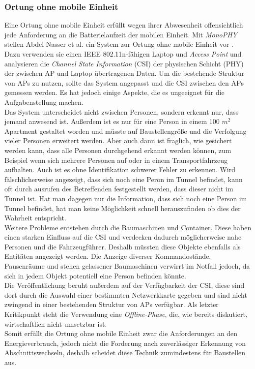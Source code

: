 \subsubsection{Ortung ohne mobile Einheit}
\label{ch:Vorherige:sec:CSI}
Eine Ortung ohne mobile Einheit erfüllt wegen ihrer Abwesenheit offensichtlich jede Anforderung an die Batterielaufzeit der mobilen Einheit.
Mit \emph{MonoPHY} stellen Abdel-Nasser et al. ein System zur Ortung ohne mobile Einheit vor \cite{abdel2013monophy}. \\
Dazu verwenden sie einen IEEE 802.11n-fähigen Laptop und \emph{Access Point} und analysieren die \emph{Channel State Information} (CSI) der physischen Schicht (PHY) der zwischen AP und Laptop übertragenen Daten.
Um die bestehende Struktur von APs zu nutzen, sollte das System angepasst und die CSI zwischen den APs gemessen werden.
Es hat jedoch einige Aspekte, die es ungeeignet für die Aufgabenstellung machen.\\
Das System unterscheidet nicht zwischen Personen, sondern erkennt nur, dass jemand anwesend ist. 
Außerdem ist es nur für eine Person in einem 100 $m^2$ Apartment gestaltet worden und müsste auf Baustellengröße und die Verfolgung vieler Personen erweitert werden.
Aber auch dann ist fraglich, wie gesichert werden kann, dass alle Personen durchgehend erkannt werden können, zum Beispiel wenn sich mehrere Personen auf oder in einem Transportfahrzeug aufhalten.
Auch ist es ohne Identifikation schwerer Fehler zu erkennen. 
Wird fälschlicherweise angezeigt, dass sich noch eine Peron im Tunnel befindet, kann oft durch ausrufen des Betreffenden festgestellt werden, dass dieser nicht im Tunnel ist. 
Hat man dagegen nur die Information, dass sich noch eine Person im Tunnel befindet, hat man keine Möglichkeit schnell herauszufinden ob dies der Wahrheit entspricht.\\
Weitere Probleme entstehen durch die Baumaschinen und Container. 
Diese haben einen starken Einfluss auf die CSI und verdecken dadurch möglicherweise nahe Personen und die Fahrzeugführer.
Deshalb müssten diese Objekte ebenfalls als Entitäten angezeigt werden. 
Die Anzeige diverser Kommandostände, Pausenräume und stehen gelassener Baumaschinen verwirrt im Notfall jedoch, da sich in jedem Objekt potentiell eine Person befinden könnte.\\
Die Veröffentlichung beruht außerdem auf der Verfügbarkeit der CSI, diese sind dort durch die Auswahl einer bestimmten Netzwerkkarte gegeben und sind nicht zwingend in einer bestehenden Struktur von APs verfügbar.
Als letzter Kritikpunkt steht die Verwendung eine \emph{Offline-Phase}, die, wie bereits diskutiert, wirtschaftlich nicht umsetzbar ist. \\ 
Somit erfüllt die Ortung ohne mobile Einheit zwar die Anforderungen an den Energieverbrauch, jedoch nicht die Forderung nach zuverlässiger Erkennung von Abschnittswechseln, deshalb scheidet diese Technik zumindestens für Baustellen aus.




